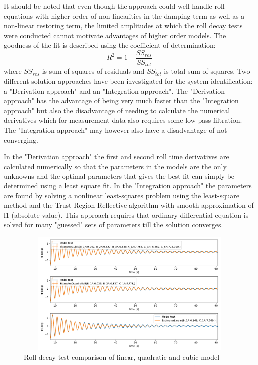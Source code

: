 It should be noted that even though the approach could well handle roll equations with higher order of non-linearities in the damping term as well as a non-linear restoring term, the limited amplitudes at which the roll decay tests were conducted cannot motivate advantages of higher order models. 
The goodness of the fit is described using the coefficient of determination:
\begin{equation} \label{eq:R2}
R^2=1-\frac{SS_{res}}{SS_{tot}}
\end{equation}
where $SS_{res}$ is sum of squares of residuals and $SS_{tot}$ is total sum of squares. Two different solution approaches have been investigated for the system identification: a "Derivation approach" and an "Integration approach". 
The "Derivation approach" has the advantage of being very much faster than the "Integration approach" but also the disadvantage of needing to calculate the numerical derivatives which for measurement data also requires some low pass filtration. The "Integration approach" may however also have a disadvantage of not converging.



In the "Derivation approach" the first and second roll time derivatives are calculated numerically so that the parameters in the models are the only unknowns and the optimal parameters that gives the best fit can simply be determined using a least square fit.
In the "Integration approach" the parameters are found by solving a nonlinear least-squares problem using the least-square method \cite{noauthor_scipyoptimizeleast_squares_nodate} and the Trust Region Reflective algorithm with smooth approximation of l1 (absolute value). This approach requires that ordinary differential equation is solved for many "guessed" sets of parameters till the solution converges.

\begin{figure}[H]
    \centering
    \includegraphics[width=12cm, height = 6cm ]{figures/roll_decay_model_compare.pdf}
    \caption{Roll decay test comparison of linear, quadratic and cubic model}
    \label{fig:roll_decay_model_compare}
\end{figure}

